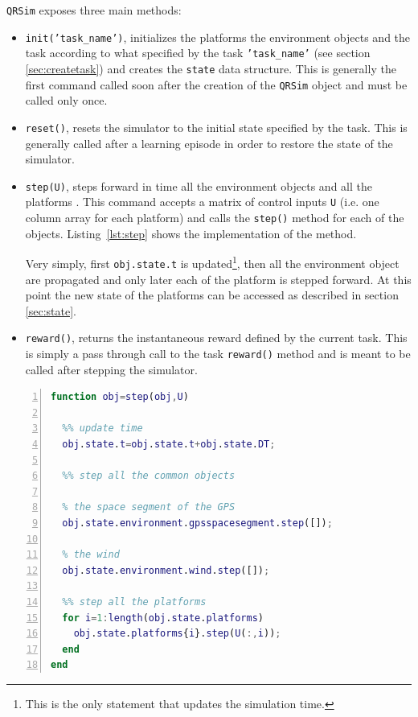 \documentclass[a4paper,11pt]{report}
\newcommand{\sname}{QRSim\xspace}
\newcommand{\snamettt}{\texttt{QRSim}\xspace}
\begin{document}
\snamettt exposes three main methods:
\begin{itemize}
 \item \texttt{init('task\_name')}, initializes the platforms the environment objects and the task according to what specified by the task \texttt{'task\_name'} (see section \ref{sec:createtask}) and creates the \texttt{state} data structure. This is generally the first command called soon after the creation of the \snamettt object and must be called only once.
 \item \texttt{reset()}, resets the simulator to the initial state specified by the task. This is generally called after a learning episode in order to restore the state of the simulator. 
 \item \texttt{step(U)}, steps forward in time all the environment objects and all the platforms . This command accepts a matrix of control inputs \texttt{U} (i.e. one column array for each platform) and calls the \texttt{step()} method for each of the objects. Listing~\ref{lst:step} shows the implementation of the method.

Very simply, first \texttt{obj.state.t} is updated\footnote{This is the only statement that updates the simulation time.}, then all the environment object are propagated and only later each of the platform is stepped forward. At this point the new state of the platforms can be accessed as described in section \ref{sec:state}.
 \item \texttt{reward()}, returns the instantaneous reward defined by the current task. This is simply a pass through call to the task \texttt{reward()} method and is meant to be called after stepping the simulator.
\end{itemize}

\begin{lstlisting}[float=ht!bp,caption=\sname step() method,language=Matlab,frame=lines,label=lst:step,numbers=left,basicstyle=\small]
function obj=step(obj,U)
           
  %% update time
  obj.state.t=obj.state.t+obj.state.DT;
                        
  %% step all the common objects
            
  % the space segment of the GPS
  obj.state.environment.gpsspacesegment.step([]);
            
  % the wind
  obj.state.environment.wind.step([]);
            
  %% step all the platforms            
  for i=1:length(obj.state.platforms)
    obj.state.platforms{i}.step(U(:,i));
  end
end
\end{lstlisting}
\end{document}
